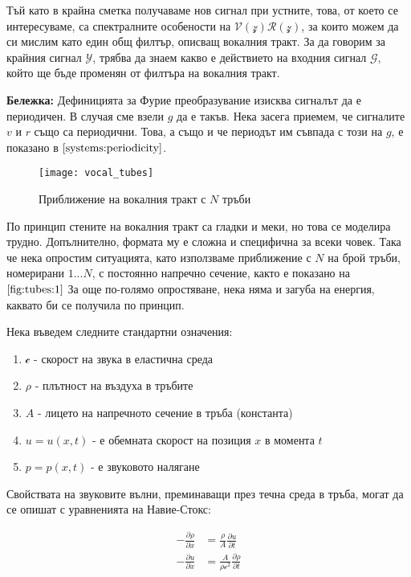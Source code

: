 \documentclass[main.tex]{subfiles}
\begin{document}
Тъй като в крайна сметка получаваме нов сигнал при устните, това, от което се интересуваме, са спектралните особености на $\mathcal{V}(\mathcal{z})\mathcal{R}(\mathcal{z})$, за които можем да си мислим като един общ филтър, описващ вокалния тракт. За да говорим за крайния сигнал $\mathcal{Y}$, трябва да знаем какво е действието на входния сигнал $\mathcal{G}$, който ще бъде променян от филтъра на вокалния тракт. 

\begin{footnotesize}
    \textbf{Бележка:} Дефиницията за Фурие преобразувание изисква сигналът да е периодичен. В случая сме взели $g$ да е такъв. Нека засега приемем, че сигналите $v$ и $r$ също са периодични. Това, а също и че периодът им съвпада с този на $g$, е показано в $\autoref{systems:periodicity}$.
\end{footnotesize}

\begin{figure}[ht]%
    \texttt{[image: vocal\_tubes]}%
    \caption{Приближение на вокалния тракт с $N$ тръби}%
    \label{fig:tubes:1}
\end{figure}

По принцип стените на вокалния тракт са гладки и меки, но това се моделира трудно. Допълнително, формата му е сложна и специфична за всеки човек. Така че нека опростим ситуацията, като използваме приближение с $N$ на брой тръби, номерирани $1...N$, с постоянно напречно сечение, както е показано на $\autoref{fig:tubes:1}$
За още по-голямо опростяване, нека няма и загуба на енергия, каквато би се получила по принцип.


Нека въведем следните стандартни означения:
\begin{enumerate}
    \item{$\mathcal{c}$} - скорост на звука в еластична среда
    \item{$\rho$} - плътност на въздуха в тръбите
    \item{$A$} - лицето на напречното сечение в тръба (константа)
    \item{$u = u(x, t)$} - е обемната скорост на позиция $x$ в момента $t$
    \item{$p = p(x, t)$} - е звуковото налягане
\end{enumerate}

Свойствата на звуковите вълни, преминаващи през течна среда в тръба, могат да се опишат с уравненията на Навие-Стокс:

\begin{subequations}
    \label{eq:tubes:01}
    \begin{flalign}
        -\frac{\partial\rho}{\partial x} & = \frac{\rho}{A} \frac{\partial u}{\partial t}\\
        -\frac{\partial u}{\partial x} & = \frac{A}{\rho \mathcal{c}^2} \frac{\partial \rho}{\partial t}
    \end{flalign}
\end{subequations}
\end{document}

